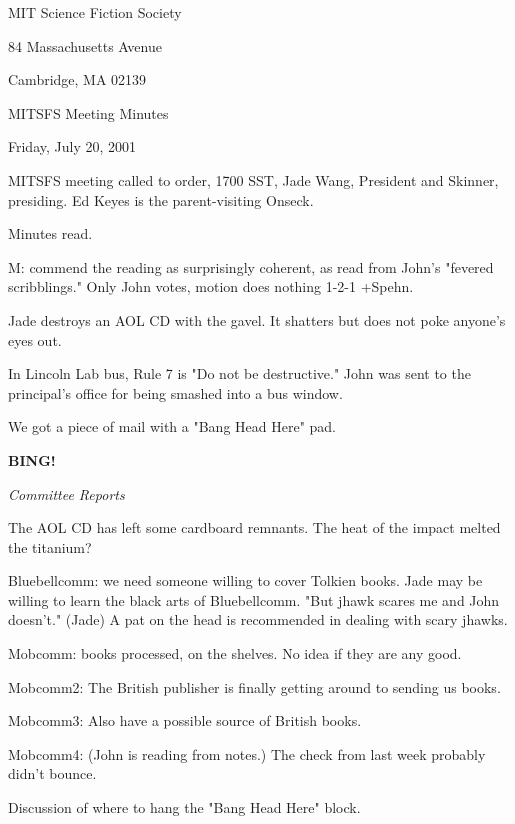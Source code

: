 \documentclass[12pt]{article}
\newcommand{\bing}{{\bf BING!} }
\newcommand{\goto}[1]{\bing \vskip 12pt \centerline{{\em{#1}}}}
\begin{document}
\begin{center}

MIT Science Fiction Society 

84 Massachusetts Avenue

Cambridge, MA 02139

\vspace{12pt}

MITSFS Meeting Minutes 

Friday, July 20, 2001

\end{center}
 
\vspace{18pt}

\setlength{\parskip}{6pt}

\noindent
MITSFS meeting called to order, 1700 SST, Jade Wang, President and
Skinner, presiding. Ed Keyes is the parent-visiting Onseck.

Minutes read.

M: commend the reading as surprisingly coherent, as read from John's "fevered scribblings." Only John votes, motion does nothing 1-2-1 +Spehn.

Jade destroys an AOL CD with the gavel. It shatters but does not poke anyone's eyes out.

In Lincoln Lab bus, Rule 7 is "Do not be destructive." John was sent to the principal's office for being smashed into a bus window.

We got a piece of mail with a "Bang Head Here" pad.

\goto{Committee Reports}

The AOL CD has left some cardboard remnants. The heat of the impact melted the titanium?

Bluebellcomm: we need someone willing to cover Tolkien books. Jade may be willing to learn the black arts of Bluebellcomm. "But jhawk scares me and John doesn't." (Jade) A pat on the head is recommended in dealing with scary jhawks.

Mobcomm: books processed, on the shelves. No idea if they are any good.

Mobcomm2: The British publisher is finally getting around to sending us books.

Mobcomm3: Also have a possible source of British books.

Mobcomm4: (John is reading from notes.) The check from last week probably didn't bounce.

Discussion of where to hang the "Bang Head Here" block.
\end{document}
